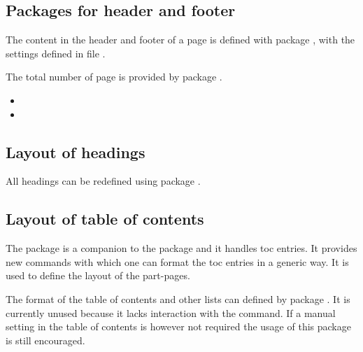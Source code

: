 
\subsection{Packages for header and footer}
\label{sec:packages:headfoot}

The content in the header and footer of a page is defined with package 
, with the settings defined in file 
.

The total number of page is provided by package .

\begin{itemize}[noitemsep]
	\item {}
	\item {}
\end{itemize}


\subsection{Layout of headings}
\label{sec:packages:headings}

All headings can be redefined using package .


\subsection{Layout of table of contents}
\label{sec:packages:TOC}

The  package is a companion to the  package and it handles toc entries. It provides new commands with which one
can format the toc entries in a generic way. It is used to define the layout of the part-pages.

The format of the table of contents and other lists can defined by package . It is currently unused because it lacks interaction with the  command. If a manual setting in the table of contents is however not required the usage of this package is still encouraged.

